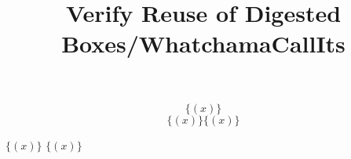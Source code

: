 \documentclass{article}
\title{Verify Reuse of Digested Boxes/WhatchamaCallIts}
\def\brackets#1{\{#1\}}
\def\parens#1{(#1)}
\def\BoxDup#1{#1#1}
\def\SaveBox#1{\def\mysavedbox{#1}#1}
\def\UseBox{\mysavedbox}
\begin{document}
\[ \brackets{\parens{x}} \]
\[ \BoxDup{\brackets{\parens{x}}} \]

\SaveBox{$\brackets{\parens{x}}$}
\UseBox
\end{document}
